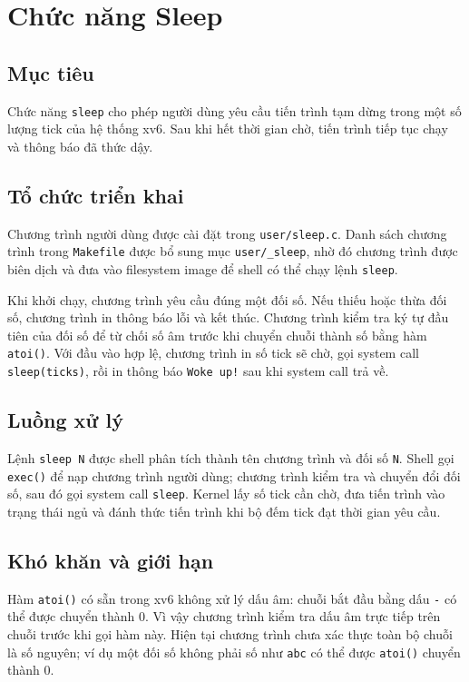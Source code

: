 \section{Chức năng Sleep}

\subsection{Mục tiêu}
Chức năng \texttt{sleep} cho phép người dùng yêu cầu tiến trình tạm dừng trong một số lượng tick của hệ thống xv6. Sau khi hết thời gian chờ, tiến trình tiếp tục chạy và thông báo đã thức dậy.

\subsection{Tổ chức triển khai}
Chương trình người dùng được cài đặt trong \texttt{user/sleep.c}. Danh sách chương trình trong \texttt{Makefile} được bổ sung mục \texttt{user/\_sleep}, nhờ đó chương trình được biên dịch và đưa vào filesystem image để shell có thể chạy lệnh \texttt{sleep}.

Khi khởi chạy, chương trình yêu cầu đúng một đối số. Nếu thiếu hoặc thừa đối số, chương trình in thông báo lỗi và kết thúc. Chương trình kiểm tra ký tự đầu tiên của đối số để từ chối số âm trước khi chuyển chuỗi thành số bằng hàm \texttt{atoi()}. Với đầu vào hợp lệ, chương trình in số tick sẽ chờ, gọi system call \texttt{sleep(ticks)}, rồi in thông báo \texttt{Woke up!} sau khi system call trả về.

\subsection{Luồng xử lý}
Lệnh \texttt{sleep N} được shell phân tích thành tên chương trình và đối số \texttt{N}. Shell gọi \texttt{exec()} để nạp chương trình người dùng; chương trình kiểm tra và chuyển đổi đối số, sau đó gọi system call \texttt{sleep}. Kernel lấy số tick cần chờ, đưa tiến trình vào trạng thái ngủ và đánh thức tiến trình khi bộ đếm tick đạt thời gian yêu cầu.

\subsection{Khó khăn và giới hạn}
Hàm \texttt{atoi()} có sẵn trong xv6 không xử lý dấu âm: chuỗi bắt đầu bằng dấu \texttt{-} có thể được chuyển thành 0. Vì vậy chương trình kiểm tra dấu âm trực tiếp trên chuỗi trước khi gọi hàm này. Hiện tại chương trình chưa xác thực toàn bộ chuỗi là số nguyên; ví dụ một đối số không phải số như \texttt{abc} có thể được \texttt{atoi()} chuyển thành 0.

